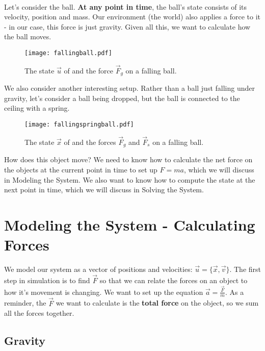 \documentclass[]{article}
\begin{document}
\paragraph{}

Let's consider the ball. \textbf{At any point in time}, the ball's state consists of its velocity, position and mass. Our environment (the world) also applies a force to it - in our case, this force is just gravity. Given all this, we want to calculate how the ball moves.   

\begin{figure}[htp]
    \centering
    \texttt{[image: fallingball.pdf]}
    \caption{The state $\vec{u}$ of and the force $\vec{F}_g$ on a falling ball.}
\end{figure}

We also consider another interesting setup. Rather than a ball just falling under gravity, let's consider a ball being dropped, but the ball is connected to the ceiling with a spring. 

\begin{figure}[htp]
    \centering
    \texttt{[image: fallingspringball.pdf]}
    \caption{The state $\vec{x}$ of and the forces $\vec{F}_g$ and $\vec{F}_s$ on a falling ball.}
\end{figure}

How does this object move? We need to know how to calculate the net force on the objects at the current point in time to set up $F = ma$, which we will discuss in Modeling the System. We also want to know how to compute the state at the next point in time, which we will discuss in Solving the System.



\section{Modeling the System - Calculating Forces}

We model our system as a vector of positions and velocities: $\vec{u} = \{\vec{x}, \vec{v}\}$. The first step in simulation is to find $\vec{F}$ so that we can relate the forces on an object to how it's movement is changing. We want to set up the equation $\vec{a} = \frac{\vec{F}}{m}$. As a reminder, the $\vec{F}$ we want to calculate is the \textbf{total force} on the object, so we sum all the forces together.

\subsection{Gravity}
\end{document}
